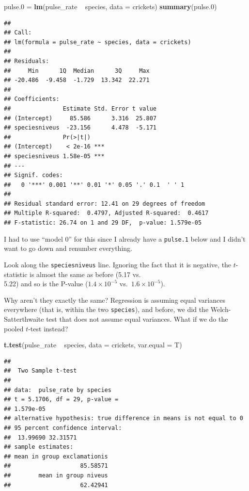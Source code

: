 \documentclass[]{tufte-book}
\newenvironment{Shaded}{}{}
\newcommand{\DataTypeTok}[1]{\textcolor[rgb]{0.56,0.13,0.00}{#1}}
\newcommand{\FloatTok}[1]{\textcolor[rgb]{0.25,0.63,0.44}{#1}}
\newcommand{\KeywordTok}[1]{\textcolor[rgb]{0.00,0.44,0.13}{\textbf{#1}}}
\newcommand{\NormalTok}[1]{#1}
\newcommand{\OperatorTok}[1]{\textcolor[rgb]{0.40,0.40,0.40}{#1}}
\newcommand{\StringTok}[1]{\textcolor[rgb]{0.25,0.44,0.63}{#1}}
\theoremstyle{definition}
\theoremstyle{definition}
\theoremstyle{definition}
\theoremstyle{remark}
\begin{document}
\begin{Shaded}
\begin{Highlighting}[]
\NormalTok{pulse}\FloatTok{.0}\NormalTok{ =}\StringTok{ }\KeywordTok{lm}\NormalTok{(pulse_rate }\OperatorTok{~}\StringTok{ }\NormalTok{species, }\DataTypeTok{data =}\NormalTok{ crickets)}
\KeywordTok{summary}\NormalTok{(pulse}\FloatTok{.0}\NormalTok{)}
\end{Highlighting}
\end{Shaded}

\begin{verbatim}
## 
## Call:
## lm(formula = pulse_rate ~ species, data = crickets)
## 
## Residuals:
##     Min      1Q  Median      3Q     Max 
## -20.486  -9.458  -1.729  13.342  22.271 
## 
## Coefficients:
##               Estimate Std. Error t value
## (Intercept)     85.586      3.316  25.807
## speciesniveus  -23.156      4.478  -5.171
##               Pr(>|t|)    
## (Intercept)    < 2e-16 ***
## speciesniveus 1.58e-05 ***
## ---
## Signif. codes:  
##   0 '***' 0.001 '**' 0.01 '*' 0.05 '.' 0.1  ' ' 1
## 
## Residual standard error: 12.41 on 29 degrees of freedom
## Multiple R-squared:  0.4797, Adjusted R-squared:  0.4617 
## F-statistic: 26.74 on 1 and 29 DF,  p-value: 1.579e-05
\end{verbatim}

I had to use ``model 0'' for this since I already have a
\texttt{pulse.1} below and I didn't want to go down and renumber
everything.

Look along the \texttt{speciesniveus} line. Ignoring the fact that it is
negative, the \(t\)-statistic is almost the same as before (5.17 vs.\\
5.22) and so is the P-value (\(1.4 \times 10^{-5}\)
vs.~\(1.6 \times 10^{-5}\)).

Why aren't they exactly the same? Regression is assuming equal variances
everywhere (that is, within the two \texttt{species}), and before, we
did the Welch-Satterthwaite test that does not assume equal variances.
What if we do the pooled \(t\)-test instead?

\begin{Shaded}
\begin{Highlighting}[]
\KeywordTok{t.test}\NormalTok{(pulse_rate }\OperatorTok{~}\StringTok{ }\NormalTok{species, }\DataTypeTok{data =}\NormalTok{ crickets, }
    \DataTypeTok{var.equal =}\NormalTok{ T)}
\end{Highlighting}
\end{Shaded}

\begin{verbatim}
## 
##  Two Sample t-test
## 
## data:  pulse_rate by species
## t = 5.1706, df = 29, p-value =
## 1.579e-05
## alternative hypothesis: true difference in means is not equal to 0
## 95 percent confidence interval:
##  13.99690 32.31571
## sample estimates:
## mean in group exclamationis 
##                    85.58571 
##        mean in group niveus 
##                    62.42941
\end{verbatim}
\end{document}
